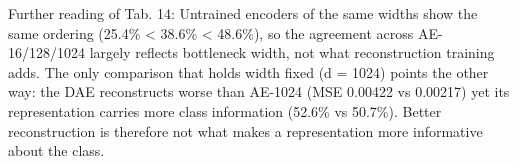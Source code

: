 Further reading of Tab. 14: Untrained encoders of the same widths show the same ordering (25.4\% < 38.6\% < 48.6\%), so the agreement across AE-16/128/1024 largely reflects bottleneck width, not what reconstruction training adds. The only comparison that holds width fixed (d = 1024) points the other way: the DAE reconstructs worse than AE-1024 (MSE 0.00422 vs 0.00217) yet its representation carries more class information (52.6\% vs 50.7\%). Better reconstruction is therefore not what makes a representation more informative about the class.
